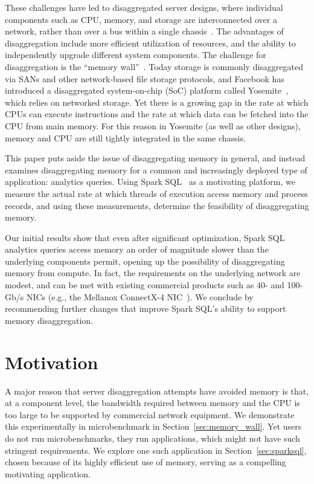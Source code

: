 \documentclass[9pt]{sig-alternate-05-2015}
\begin{document}
These challenges have led to disaggregated server designs, where individual
components such as CPU, memory, and storage are interconnected over a network,
rather than over a bus within a single
chassis~\cite{Han:2013:NSR:2535771.2535778}.  The advantages of disaggregation
include more efficient utilization of resources, and the ability to
independently upgrade different system components.  The challenge for
disaggregation is the ``memory wall''~\cite{Wulf:1995:HMW:216585.216588}. Today
storage is commonly disaggregated via SANs and other network-based file storage
protocols, and Facebook has introduced a disaggregated system-\-on-\-chip (SoC)
platform called Yosemite~\cite{fb-yosemite}, which relies on networked storage.
Yet there is a growing gap in the rate at which CPUs can execute instructions
and the rate at which data can be fetched into the CPU from main memory.  For
this reason in Yosemite (as well as other designs), memory and CPU are still
tightly integrated in the same chassis.

This paper puts aside the issue of disaggregating memory in general, and
instead examines disaggregating memory for a common and increasingly deployed
type of application: analytics queries. Using Spark
SQL~\cite{Armbrust:2015:SSR:2723372.2742797} as a motivating platform, we
measure the actual rate at which threads of execution access memory and process
records, and using these measurements, determine the feasibility of
disaggregating memory.

Our initial results show that even after significant optimization, Spark SQL
analytics queries access memory an order of magnitude slower than the
underlying components permit, opening up the possibility of disaggregating
memory from compute.  In fact, the requirements on the underlying network are
modest, and can be met with existing commercial products such as 40- and
100-Gb/s NICs (e.g., the Mellanox ConnectX-4 NIC~\cite{mellanox100g}).  We
conclude by recommending further changes that improve Spark SQL's ability to
support memory disaggregation.

\section{Motivation}

A major reason that server disaggregation attempts have avoided memory is that,
at a component level, the bandwidth required between memory and the CPU is too
large to be supported by commercial network equipment. We demonstrate this
experimentally in microbenchmark in Section~\ref{sec:memory_wall}.  Yet users
do not run microbenchmarks, they run applications, which might not have such
stringent requirements.  We explore one such application in
Section~\ref{sec:sparksql}, chosen because of its highly efficient use of
memory, serving as a compelling motivating application.
\end{document}
